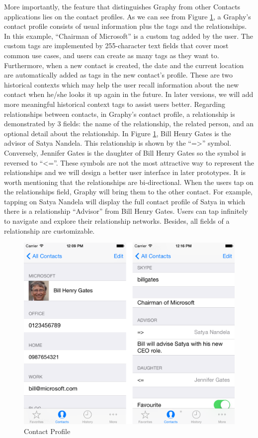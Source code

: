 More importantly, the feature that distinguishes Graphy from other Contacts applications lies on the contact profiles. As we can see from Figure \ref{fg:contactscreen}, a Graphy's contact profile consists of usual information plus the tags and the relationships. In this example, ``Chairman of Microsoft'' is a custom tag added by the user. The custom tags are implemented by 255-character text fields that cover most common use cases, and users can create as many tags as they want to. Furthermore, when a new contact is created, the date and the current location are automatically added as tags in the new contact's profile. These are two historical contexts which may help the user recall information about the new contact when he/she looks it up again in the future. In later versions, we will add more meaningful historical context tags to assist users better. Regarding relationships between contacts, in Graphy's contact profile, a relationship is demonstrated by 3 fields: the name of the relationship, the related person, and an optional detail about the relationship. In Figure \ref{fg:contactscreen}, Bill Henry Gates is the advisor of Satya Nandela. This relationship is shown by the ``=>'' symbol. Conversely, Jennifer Gates is the daughter of Bill Henry Gates so the symbol is reversed to ``<=''. These symbols are not the most attractive way to represent the relationships and we will design a better user interface in later prototypes. It is worth mentioning that the relationships are bi-directional. When the users tap on the relationships field, Graphy will bring them to the other contact. For example, tapping on Satya Nandela will display the full contact profile of Satya in which there is a relationship ``Advisor'' from Bill Henry Gates. Users can tap infinitely to navigate and explore their relationship networks. Besides, all fields of a relationship are customizable.

\begin{figure}[!h]
\begin{centering}
\includegraphics[scale=0.3]{pics/contactscreen}
\caption{Contact Profile}\label{fg:contactscreen}
\end{centering}
\end{figure}

